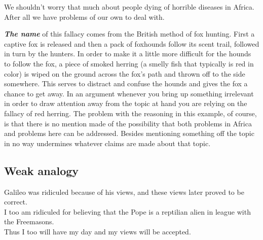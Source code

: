 \documentclass[12pt, openany]{book}
\begin{document}
\begin{center}

\begin{argument}

We shouldn't worry that much about people dying of horrible diseases in Africa.\\

After all we have problems of our own to deal with.

\end{argument}

\end{center}

\textbf{\emph{The name}} of this fallacy comes from the British method of fox hunting. First a captive fox is released and then a pack of foxhounds follow its scent trail, followed in turn by the hunters. In order to make it a little more difficult for the hounds to follow the fox, a piece of smoked herring (a smelly fish that typically is red in color) is wiped on the ground across the fox's path and thrown off to the side somewhere. This serves to distract and confuse the hounds and gives the fox a chance to get away. In an argument whenever you bring up something irrelevant in order to draw attention away from the topic at hand you are relying on the fallacy of red herring. The problem with the reasoning in this example, of course, is that there is no mention made of the possibility that both problems in Africa and problems here can be addressed. Besides mentioning something off the topic in no way undermines whatever claims are made about that topic.

\hypertarget{weak-analogy}{%
\subsection*{Weak analogy}\label{weak-analogy}}


\begin{center}

\begin{argument}

Galileo was ridiculed because of his views, and these views later proved to be correct.\\
I too am ridiculed for believing that the Pope is a reptilian alien in league with the Freemasons.\\

Thus I too will have my day and my views will be accepted.

\end{argument}

\end{center}
\end{document}
